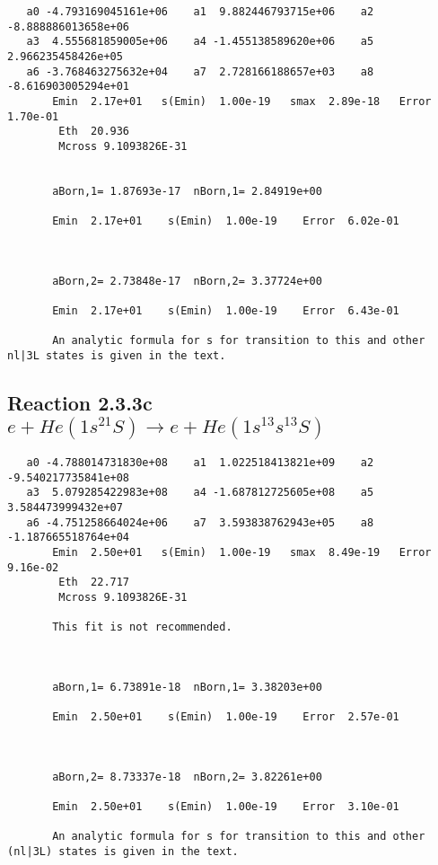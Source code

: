 \documentclass[12pt,dvipdfmx]{article}
\begin{document}
\begin{small}\begin{verbatim}
   a0 -4.793169045161e+06    a1  9.882446793715e+06    a2 -8.888886013658e+06
   a3  4.555681859005e+06    a4 -1.455138589620e+06    a5  2.966235458426e+05
   a6 -3.768463275632e+04    a7  2.728166188657e+03    a8 -8.616903005294e+01
       Emin  2.17e+01   s(Emin)  1.00e-19   smax  2.89e-18   Error  1.70e-01
        Eth  20.936
        Mcross 9.1093826E-31


       aBorn,1= 1.87693e-17  nBorn,1= 2.84919e+00

       Emin  2.17e+01    s(Emin)  1.00e-19    Error  6.02e-01



       aBorn,2= 2.73848e-17  nBorn,2= 3.37724e+00

       Emin  2.17e+01    s(Emin)  1.00e-19    Error  6.43e-01

       An analytic formula for s for transition to this and other nl|3L states is given in the text.
\end{verbatim}\end{small}





\newpage
\subsection{
Reaction 2.3.3c $e + He(1s^21S) \rightarrow e + He(1s^13s^13S)$}

















\begin{small}\begin{verbatim}
   a0 -4.788014731830e+08    a1  1.022518413821e+09    a2 -9.540217735841e+08
   a3  5.079285422983e+08    a4 -1.687812725605e+08    a5  3.584473999432e+07
   a6 -4.751258664024e+06    a7  3.593838762943e+05    a8 -1.187665518764e+04
       Emin  2.50e+01   s(Emin)  1.00e-19   smax  8.49e-19   Error  9.16e-02
        Eth  22.717
        Mcross 9.1093826E-31

       This fit is not recommended.



       aBorn,1= 6.73891e-18  nBorn,1= 3.38203e+00

       Emin  2.50e+01    s(Emin)  1.00e-19    Error  2.57e-01



       aBorn,2= 8.73337e-18  nBorn,2= 3.82261e+00

       Emin  2.50e+01    s(Emin)  1.00e-19    Error  3.10e-01

       An analytic formula for s for transition to this and other (nl|3L) states is given in the text.
\end{verbatim}\end{small}
\end{document}
